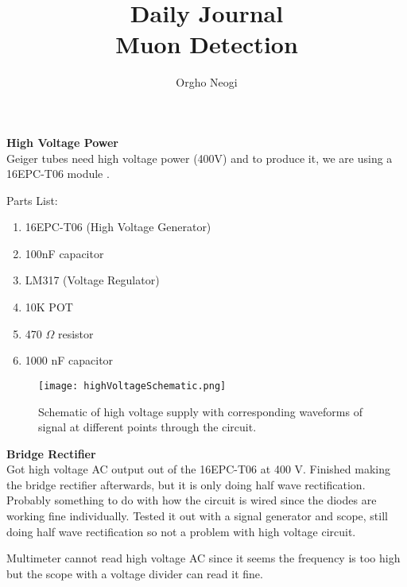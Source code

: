 \documentclass[oneside]{tufte-book}
\title{Daily Journal\\Muon Detection}
\author{Orgho Neogi}
\newenvironment{loggentry}[2]%
{\noindent\huge{\textbf{#2}}\normalsize\vspace{0.5cm}\marginnote{#1}\\}{\vspace{0.5cm}}
\begin{document}
  \maketitle


  \begin{loggentry}{2018-Aug-27}{High Voltage Power}

    Geiger tubes need high voltage power (400V) and to produce it, we are using a 16EPC-T06 module .

    Parts List:
    \begin{enumerate}
      \item 16EPC-T06 (High Voltage Generator)
      \item 100nF capacitor
      \item LM317 (Voltage Regulator)
      \item 10K POT
      \item 470 $\Omega$ resistor
      \item 1000 nF capacitor
    \end{enumerate}

    \begin{figure}
        \centering
        \texttt{[image: highVoltageSchematic.png]}
        \caption{Schematic of high voltage supply with corresponding waveforms of signal at different points through the circuit.}
        \label{highVoltagePowerSchematic}
    \end{figure}

  \end{loggentry}

  \begin{loggentry}{2018-Aug-28}{Bridge Rectifier}

    Got high voltage AC output out of the 16EPC-T06 at 400 V. Finished making the bridge rectifier afterwards, but it is only doing half wave rectification. Probably something to do with how the circuit is wired since the diodes are working fine individually. Tested it out with a signal generator and scope, still doing half wave rectification so not a problem with high voltage circuit.

    Multimeter cannot read high voltage AC since it seems the frequency is too high but the scope with a voltage divider can read it fine.

  \end{loggentry}
\end{document}

